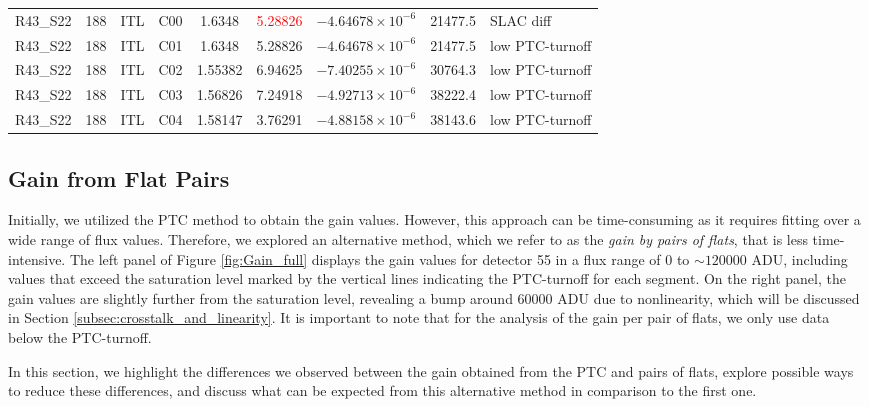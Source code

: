 \begin{landscape}
\begin{table}[!htb]
\begin{tabular}{ccccccccp{}}
    R43\_S22       &            188 & ITL      & C00  &      1.6348               & \textcolor{red}{5.28826} &  $-4.64678 \times 10^{-6}$                 & 21477.5   & SLAC diff\\
    R43\_S22       &            188 & ITL      & C01  &      1.6348               &      5.28826             &  $-4.64678 \times 10^{-6}$                 & 21477.5   & low PTC-turnoff\\
    R43\_S22       &            188 & ITL      & C02  &      1.55382              &      6.94625             &  $-7.40255 \times 10^{-6}$                 & 30764.3   & low PTC-turnoff\\
    R43\_S22       &            188 & ITL      & C03  &      1.56826              &      7.24918             &  $-4.92713 \times 10^{-6}$                 & 38222.4   & low PTC-turnoff\\
    R43\_S22       &            188 & ITL      & C04  &      1.58147              &      3.76291             &  $-4.88158 \times 10^{-6}$                 & 38143.6   & low PTC-turnoff\\
    \hline
    \end{tabular}
\end{table}
\end{landscape}

\subsection{Gain from Flat Pairs}
Initially, we utilized the PTC method to obtain the gain values. However, this approach can be time-consuming as it requires fitting over a wide range of flux values. Therefore, we explored an alternative method, which we refer to as the \textit{gain by pairs of flats}, that is less time-intensive. The left panel of Figure \ref{fig:Gain_full} displays the gain values for detector 55 in a flux range of $0$ to $\sim 120000$ ADU, including values that exceed the saturation level marked by the vertical lines indicating the PTC-turnoff for each segment. On the right panel, the gain values are slightly further from the saturation level, revealing a bump around $60000$ ADU due to nonlinearity, which will be discussed in Section \ref{subsec:crosstalk_and_linearity}. It is important to note that for the analysis of the gain per pair of flats, we only use data below the PTC-turnoff.
 
\vspace{3mm}
In this section, we highlight the differences we observed between the gain obtained from the PTC and pairs of flats, explore possible ways to reduce these differences, and discuss what can be expected from this alternative method in comparison to the first one.

